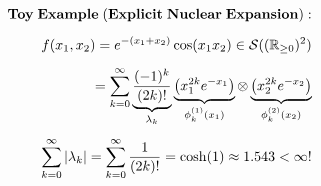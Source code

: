 \documentclass[preview]{standalone}
\begin{document}
\begin{align*}
\special{dvisvgm:raw <g id='unique000'>}\mathbf{Toy\;Example\;(Explicit\;Nuclear\;Expansion):}\\[5pt]f(x_1, x_2) = e^{-(x_1+x_2)}\cos(x_1 x_2) \in \mathcal{S}((\mathbb{R}_{\ge 0})^2)\\[5pt]= \sum_{k=0}^\infty \underbrace{\frac{(-1)^k}{(2k)!}}_{\lambda_k} \underbrace{\left(x_1^{2k} e^{-x_1}\right)}_{\phi_k^{(1)}(x_1)} \otimes \underbrace{\left(x_2^{2k} e^{-x_2}\right)}_{\phi_k^{(2)}(x_2)}\\[5pt]\sum_{k=0}^\infty |\lambda_k| = \sum_{k=0}^\infty \frac{1}{(2k)!} = \cosh(1) \approx 1.543 < \infty!\special{dvisvgm:raw </g>}
\end{align*}
\end{document}
